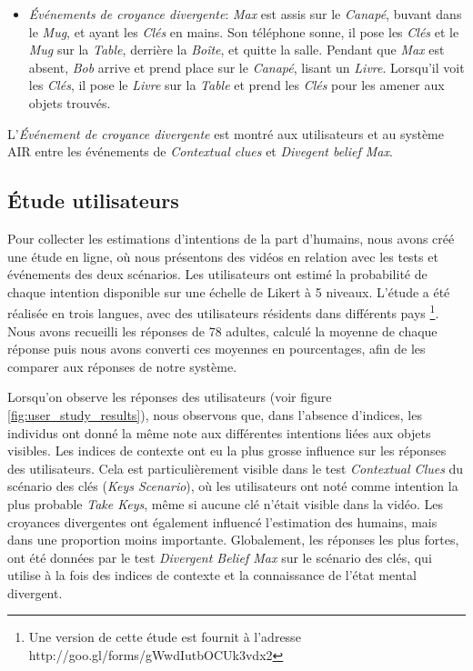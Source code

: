 \documentclass[a4paper,11pt,twoside]{StyleThese}
\begin{document}
\begin{itemize}
\item \textit{Événements de croyance divergente}: \textit{Max} est assis sur le \textit{Canapé}, buvant dans le \textit{Mug}, et ayant les \textit{Clés} en mains. Son téléphone sonne, il pose les \textit{Clés} et le \textit{Mug} sur la \textit{Table}, derrière la \textit{Boîte}, et quitte la salle. Pendant que \textit{Max} est absent, \textit{Bob} arrive et prend place sur le \textit{Canapé}, lisant un \textit{Livre}. Lorsqu'il voit les \textit{Clés}, il pose le \textit{Livre} sur la \textit{Table} et prend les \textit{Clés} pour les amener aux objets trouvés.
\end{itemize}

L'\textit{Événement de croyance divergente} est montré aux utilisateurs et au système AIR entre les événements de \textit{Contextual clues} et \textit{Divegent belief Max}.

\subsection{Étude utilisateurs}
Pour collecter les estimations d'intentions de la part d'humains, nous avons créé une étude en ligne, où nous présentons des vidéos en relation avec les tests et événements des deux scénarios. Les utilisateurs ont estimé la probabilité de chaque intention disponible sur une échelle de Likert à 5 niveaux. L'étude a été réalisée en trois langues, avec des utilisateurs résidents dans différents pays \footnote{Une version de cette étude est fournit à l'adresse http://goo.gl/forms/gWwdIutbOCUk3vdx2}. Nous avons recueilli les réponses de 78 adultes, calculé la moyenne de chaque réponse puis nous avons converti ces moyennes en pourcentages, afin de les comparer aux réponses de notre système.

Lorsqu'on observe les réponses des utilisateurs (voir figure \ref{fig:user_study_results}), nous observons que, dans l'absence d'indices, les individus ont donné la même note aux différentes intentions liées aux objets visibles. Les indices de contexte ont eu la plus grosse influence sur les réponses des utilisateurs. Cela est particulièrement visible dans le test \textit{Contextual Clues} du scénario des clés (\textit{Keys Scenario}), où les utilisateurs ont noté comme intention la plus probable \textit{Take Keys}, même si aucune clé n'était visible dans la vidéo. Les croyances divergentes ont également influencé l'estimation des humains, mais dans une proportion moins importante. Globalement, les réponses les plus fortes, ont été données par le test \textit{Divergent Belief Max} sur le scénario des clés, qui utilise à la fois des indices de contexte et la connaissance de l'état mental divergent.
\end{document}
